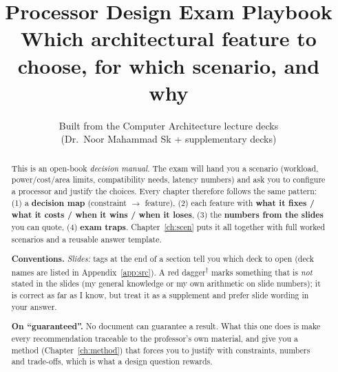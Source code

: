 \documentclass[10.5pt,a4paper]{report}
\title{\Huge\bfseries Processor Design Exam Playbook\\[6pt]
\Large Which architectural feature to choose, for which scenario, and why}
\author{Built from the Computer Architecture lecture decks\\(Dr.\ Noor Mahammad Sk + supplementary decks)}
\date{}
\newcommand{\bs}{\textsuperscript{\textcolor{avoidc}{$\dagger$}}}
\begin{document}
\maketitle
\thispagestyle{empty}

\begin{abstract}
\noindent This is an open-book \emph{decision manual}. The exam will hand you a scenario (workload, power/cost/area limits, compatibility needs, latency numbers) and ask you to configure a processor and justify the choices. Every chapter therefore follows the same pattern: (1) a \textbf{decision map} (constraint $\rightarrow$ feature), (2) each feature with \textbf{what it fixes / what it costs / when it wins / when it loses}, (3) the \textbf{numbers from the slides} you can quote, (4) \textbf{exam traps}. Chapter~\ref{ch:scen} puts it all together with full worked scenarios and a reusable answer template.

\medskip
\noindent\textbf{Conventions.}
\emph{Slides:} tags at the end of a section tell you which deck to open (deck names are listed in Appendix~\ref{app:src}).
A red dagger\bs{} marks something that is \emph{not} stated in the slides (my general knowledge or my own arithmetic on slide numbers); it is correct as far as I know, but treat it as a supplement and prefer slide wording in your answer.

\medskip
\noindent\textbf{On ``guaranteed''.} No document can guarantee a result. What this one does is make every recommendation traceable to the professor's own material, and give you a method (Chapter~\ref{ch:method}) that forces you to justify with constraints, numbers and trade-offs, which is what a design question rewards.
\end{abstract}

\tableofcontents

\setcounter{chapter}{-1}









\end{document}
